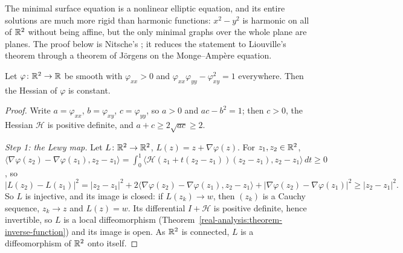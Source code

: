 The minimal surface equation is a nonlinear elliptic equation, and its entire solutions are much more rigid than harmonic functions: $x^2 - y^2$ is harmonic on all of
$\mathbb{R}^2$ without being affine, but the only minimal graphs over the whole plane are planes. The proof below is Nitsche's \cite{nitsche-1957}; it reduces the statement to
Liouville's theorem through a theorem of J\"orgens on the Monge--Amp\`ere equation.

\begin{lemma}[J\"orgens]\label{riemannian-geometry:lemma-jorgens}
Let $\varphi \colon \mathbb{R}^2 \to \mathbb{R}$ be smooth with $\varphi_{xx} > 0$ and $\varphi_{xx}\varphi_{yy} - \varphi_{xy}^2 = 1$ everywhere. Then the Hessian of $\varphi$ is constant.
\end{lemma}

\begin{proof}
Write $a = \varphi_{xx}$, $b = \varphi_{xy}$, $c = \varphi_{yy}$, so $a > 0$ and $ac - b^2 = 1$; then $c > 0$, the Hessian $\mathcal{H}$ is positive definite, and
$a + c \geq 2\sqrt{ac} \geq 2$.

\emph{Step 1: the Lewy map.} Let $L \colon \mathbb{R}^2 \to \mathbb{R}^2$, $L(z) = z + \nabla\varphi(z)$. For $z_1, z_2 \in \mathbb{R}^2$,
$\langle\nabla\varphi(z_2) - \nabla\varphi(z_1), z_2 - z_1\rangle = \int_0^1\langle\mathcal{H}(z_1 + t(z_2 - z_1))(z_2 - z_1), z_2 - z_1\rangle\,dt \geq 0$, so
\[
|L(z_2) - L(z_1)|^2 = |z_2 - z_1|^2 + 2\langle\nabla\varphi(z_2) - \nabla\varphi(z_1), z_2 - z_1\rangle + |\nabla\varphi(z_2) - \nabla\varphi(z_1)|^2 \geq |z_2 - z_1|^2 .
\]
So $L$ is injective, and its image is closed: if $L(z_k) \to w$, then $(z_k)$ is a Cauchy sequence, $z_k \to z$ and $L(z) = w$. Its differential $I + \mathcal{H}$ is positive
definite, hence invertible, so $L$ is a local diffeomorphism (Theorem~\ref{real-analysis:theorem-inverse-function}) and its image is open. As $\mathbb{R}^2$ is connected, $L$ is a
diffeomorphism of $\mathbb{R}^2$ onto itself.


\end{proof}
